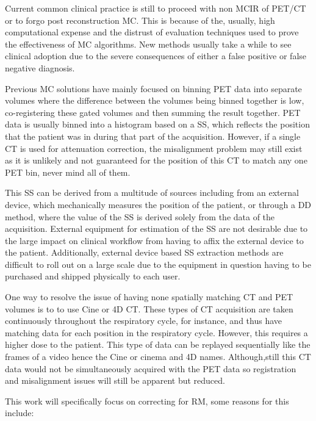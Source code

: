        Current common clinical practice is still to proceed with non \gls{MCIR} of \gls{PET}/\gls{CT} or to forgo post reconstruction \gls{MC}. This is because of the, usually, high computational expense and the distrust of evaluation techniques used to prove the effectiveness of \gls{MC} algorithms. New methods usually take a while to see clinical adoption due to the severe consequences of either a false positive or false negative diagnosis.
        
        Previous \gls{MC} solutions have mainly focused on binning \gls{PET} data into separate volumes where the difference between the volumes being binned together is low, co-registering these gated volumes and then summing the result together. \gls{PET} data is usually binned into a histogram based on a \gls{SS}, which reflects the position that the patient was in during that part of the acquisition. However, if a single \gls{CT} is used for attenuation correction, the misalignment problem may still exist as it is unlikely and not guaranteed for the position of this \gls{CT} to match any one \gls{PET} bin, never mind all of them.
        
        This \gls{SS} can be derived from a multitude of sources including from an external device, which mechanically measures the position of the patient, or through a \gls{DD} method, where the value of the \gls{SS} is derived solely from the data of the acquisition. External equipment for estimation of the \gls{SS} are not desirable due to the large impact on clinical workflow from having to affix the external device to the patient. Additionally, external device based \gls{SS} extraction methods are difficult to roll out on a large scale due to the equipment in question having to be purchased and shipped physically to each user.
        
        One way to resolve the issue of having none spatially matching \gls{CT} and \gls{PET} volumes is to to use Cine or \gls{4D} \gls{CT}. These types of \gls{CT} acquisition are taken continuously throughout the respiratory cycle, for instance, and thus have matching data for each position in the respiratory cycle. However, this requires a higher dose to the patient. This type of data can be replayed sequentially like the frames of a video hence the Cine or cinema and \gls{4D} names. Although,still this \gls{CT} data would not be simultaneously acquired with the \gls{PET} data so registration and misalignment issues will still be apparent but reduced. 
        
        This work will specifically focus on correcting for \gls{RM}, some reasons for this include:
        
